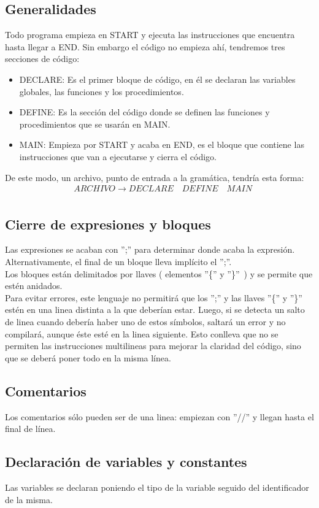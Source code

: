 \documentclass[a4paper, 12pt]{article}
\begin{document}
\subsection{Generalidades}
Todo programa empieza en START y ejecuta las instrucciones que encuentra hasta llegar a END. Sin embargo el código no empieza ahí, tendremos tres secciones de código:
\begin{itemize}
\item DECLARE: Es el primer bloque de código, en él se declaran las variables globales, las funciones y los procedimientos.
\item DEFINE: Es la sección del código donde se definen las funciones y procedimientos que se usarán en MAIN.
\item MAIN: Empieza por START y acaba en END, es el bloque que contiene las instrucciones que van a ejecutarse y cierra el código.
\end{itemize}
De este modo, un archivo, punto de entrada a la gramática, tendría esta forma:
\begin{align*}
&ARCHIVO \rightarrow DECLARE\quad DEFINE\quad MAIN\\
\end{align*}
\subsection{Cierre de expresiones y bloques}
Las expresiones se acaban con '';'' para determinar donde acaba la expresión. Alternativamente, el final de un bloque lleva implícito el '';''.\\

Los bloques están delimitados por llaves ( elementos ''\{'' y ''\}''\ ) y se permite que estén anidados.\\

Para evitar errores, este lenguaje no permitirá que los '';'' y las llaves ''\{'' y ''\}'' estén en una linea distinta a la que deberían estar. Luego, si se detecta un salto de linea cuando debería haber uno de estos símbolos, saltará un error y no compilará, aunque éste esté en la linea siguiente. Esto conlleva que no se permiten las instrucciones multilineas para mejorar la claridad del código, sino que se deberá poner todo en la misma línea.
\subsection{Comentarios}
Los comentarios sólo pueden ser de una linea: empiezan con ''//'' y llegan hasta el final de línea.
\subsection{Declaración de variables y constantes}
Las variables se declaran poniendo el tipo de la variable seguido del identificador de la misma.\\
\end{document}

